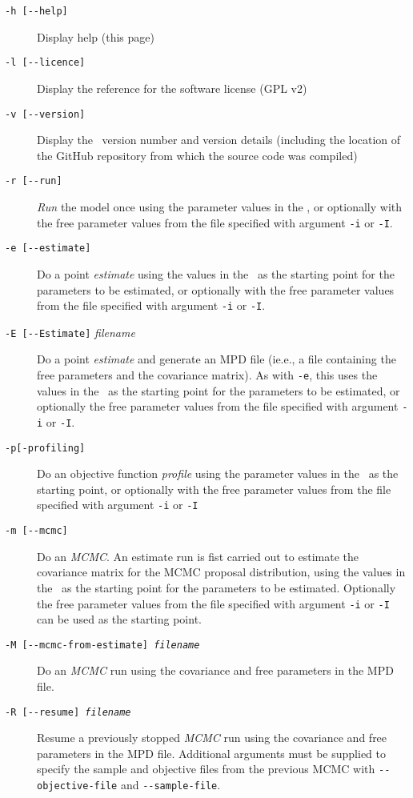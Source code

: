 \begin{description}
\item [\texttt{-h [-{}-help]}] Display help (this page)
\item [\texttt{-l [-{}-licence]}] Display the reference for the software license (GPL v2)
\item [\texttt{-v [-{}-version]}] Display the \CNAME\ version number and version details (including the location of the GitHub repository from which the source code was compiled)

\item [\texttt{-r [-{}-run]}] \emph{Run} the model once using the parameter values in the \config, or optionally with the free parameter values from the file specified with argument \texttt{-i} or \texttt{-I}.
\item [\texttt{-e [-{}-estimate]}] Do a point \emph{estimate} using the values in the \config\ as the starting point for the parameters to be estimated, or optionally with the free parameter values from the file specified with argument \texttt{-i} or \texttt{-I}.
\item [\texttt{-E [-{}-Estimate]} \emph{filename}] Do a point \emph{estimate} and generate an MPD file (ie.e., a file containing the free parameters and the covariance matrix). As with \texttt{-e}, this uses the values in the \config\ as the starting point for the parameters to be estimated, or optionally the free parameter values from the file specified with argument \texttt{-i} or \texttt{-I}.
\item [\texttt{-{p}[-profiling]}] Do an objective function \emph{profile} using the parameter values in the \config\ as the starting point, or optionally with the free parameter values from the file specified with argument \texttt{-i} or \texttt{-I}
\item [\texttt{-m [-{}-mcmc]}] Do an \emph{MCMC}. An estimate run is fist carried out to estimate the covariance matrix for the MCMC proposal distribution, using the values in the \config\ as the starting point for the parameters to be estimated. Optionally the free parameter values from the file specified with argument \texttt{-i} or \texttt{-I} can be used as the starting point.
\item [\texttt{-M [-{}-mcmc-from-estimate] \emph{filename}}] Do an \emph{MCMC} run using the covariance and free parameters in the MPD file.
\item [\texttt{-R [-{}-resume] \emph{filename}}] Resume a previously stopped \emph{MCMC} run using the covariance and free parameters in the MPD file. Additional arguments must be supplied to specify the sample and objective files from the previous MCMC with \texttt{-{}-objective-file} and \texttt{-{}-sample-file}.

\end{description}
